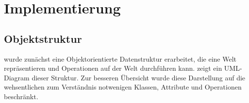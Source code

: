 \chapter{Implementierung}
\label{sec:implementation}

\section{Objektstruktur}
\label{sec:implementation:structure}

\TODO{} wurde zunächst eine Objektorientierte Datenstruktur erarbeitet, die eine Welt repräsentieren und Operationen auf der Welt durchführen kann.  zeigt ein UML-Diagram dieser Struktur. Zur besseren Übersicht wurde diese Darstellung auf die wehsentlichen zum Verständnis notwenigen Klassen, Attribute und Operationen beschränkt.

